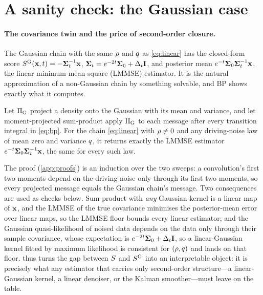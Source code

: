 \section{A sanity check: the Gaussian case}
\label{sec:sanity}

\paragraph{The covariance twin and the price of second-order closure.}
The Gaussian chain with the same $\rho$ and $q$ as \cref{eq:linear} has the closed-form score
$S^{\mathrm{G}}(\mathbf{x},t)=-\mathbf{\Sigma}_t^{-1}\mathbf{x}$, $\mathbf{\Sigma}_t=e^{-2t}\mathbf{\Sigma}_0+\Delta_t\mathbf{I}$, and posterior mean
$e^{-t}\mathbf{\Sigma}_0\mathbf{\Sigma}_t^{-1}\mathbf{x}$, the linear minimum-mean-square (LMMSE) estimator. It is the natural
approximation of a non-Gaussian chain by something solvable, and BP shows exactly what it computes.
\begin{proposition}
\label{prop:lmmse}
Let $\Pi_{\mathrm{G}}$ project a density onto the Gaussian with its mean and variance, and let
moment-projected sum-product apply $\Pi_{\mathrm{G}}$ to each message after every transition
integral in \cref{eq:bp}. For the chain \cref{eq:linear} with $\rho\neq0$ and any
driving-noise law of mean zero and variance $q$, it returns exactly the LMMSE estimator
$e^{-t}\mathbf{\Sigma}_0\mathbf{\Sigma}_t^{-1}\mathbf{x}$, the same for every such law.
\end{proposition}
The proof (\cref{app:proofs}) is an induction over the two sweeps: a convolution's first two
moments depend on the driving noise only through its first two moments, so every projected message
equals the Gaussian chain's message. Two consequences are used as checks below. Sum-product with
\emph{any} Gaussian kernel is a linear map of $\mathbf{x}$, and the LMMSE of the true covariance minimises
the posterior-mean error over linear maps, so the LMMSE floor bounds every linear estimator; and the
Gaussian quasi-likelihood of noised data depends on the data only through their sample covariance,
whose expectation is $e^{-2t}\mathbf{\Sigma}_0+\Delta_t\mathbf{I}$, so a linear-Gaussian kernel fitted by maximum likelihood is
consistent for $(\rho,q)$ and lands on that floor.  thus turns the gap between
$S$ and $S^{\mathrm{G}}$ into an interpretable object: it is precisely what any estimator that carries only
second-order structure---a linear-Gaussian kernel, a linear denoiser, or the Kalman smoother---must
leave on the table.

